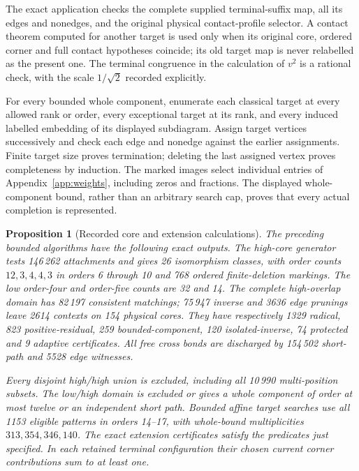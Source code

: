 \documentclass[11pt]{article}
\newtheorem{proposition}[theorem]{Proposition}
\theoremstyle{remark}\newtheorem{remark}[theorem]{Remark}
\begin{document}
The exact application checks the complete supplied terminal-suffix map,
all its edges and nonedges, and the original physical contact-profile
selector. A contact theorem computed for another target is used only
when its original core, ordered corner and full contact hypotheses
coincide; its old target map is never relabelled as the present one.
The terminal congruence in the calculation of $v^2$ is a rational check,
with the scale $1/\sqrt2$ recorded explicitly.

For every bounded whole component, enumerate each classical target
at every allowed rank or order, every exceptional target at its rank,
and every induced labelled embedding of its displayed subdiagram.
Assign target vertices successively and check each edge and nonedge
against the earlier assignments. Finite target size proves termination;
deleting the last assigned vertex proves completeness by induction.
The marked images select individual entries of
Appendix~\ref{app:weights}, including zeros and fractions. The
displayed whole-component bound, rather than an arbitrary search cap,
proves that every actual completion is represented.

\begin{proposition}[Recorded core and extension calculations]
\label{prop:local-calculations}
The preceding bounded algorithms have the following exact outputs.
The high-core generator tests 146\,262 attachments and gives 26
isomorphism classes, with order counts $12,3,4,4,3$ in orders
6 through 10 and 768 ordered finite-deletion markings. The low
order-four and order-five counts are 32 and 14.
The complete high-overlap domain has 82\,197 consistent matchings;
75\,947 inverse and 3636 edge prunings leave 2614 contexts on
154 physical cores. They have respectively 1329 radical, 823
positive-residual, 259 bounded-component, 120 isolated-inverse,
74 protected and 9 adaptive certificates. All free cross bonds
are discharged by 154\,502 short-path and 5528 edge witnesses.

Every disjoint high/high union is excluded, including all
10\,990 multi-position subsets. The low/high domain is excluded
or gives a whole component of order at most twelve or an
independent short path. Bounded affine target searches use all
1153 eligible patterns in orders 14--17, with whole-bound
multiplicities $313,354,346,140$.
The exact extension certificates satisfy the predicates just
specified. In each retained terminal configuration their chosen
\emph{current} corner contributions sum to at least one.
\end{proposition}
\end{document}
